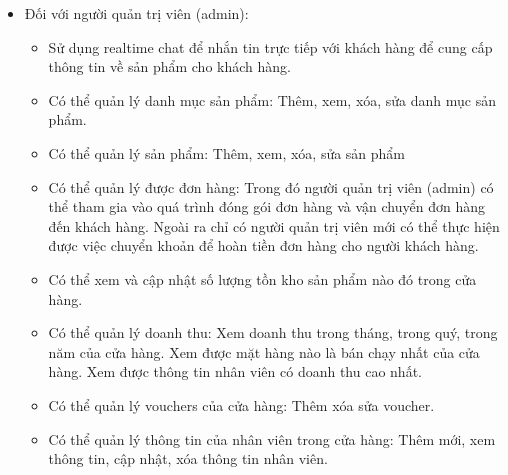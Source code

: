 \begin{itemize}
	\item Đối với người quản trị viên (admin):
	      \begin{itemize}
		      \item  Sử dụng realtime chat để nhắn tin trực tiếp với khách hàng để cung cấp thông tin về sản phẩm cho khách hàng.
		      \item Có thể quản lý danh mục sản phẩm: Thêm, xem, xóa, sửa danh mục sản phẩm.
		      \item Có thể quản lý sản phẩm: Thêm, xem, xóa, sửa sản phẩm
		      \item Có thể quản lý được đơn hàng: Trong đó người quản trị viên (admin) có thể tham gia vào quá trình đóng gói đơn hàng và vận chuyển đơn hàng đến khách hàng. Ngoài ra chỉ có người quản trị viên mới có thể thực hiện được việc chuyển khoản để hoàn tiền đơn hàng cho người khách hàng.
		      \item Có thể xem và cập nhật số lượng tồn kho sản phẩm nào đó trong cửa hàng.
		      \item Có thể quản lý doanh thu: Xem doanh thu trong tháng, trong quý, trong năm của cửa hàng. Xem được mặt hàng nào là bán chạy nhất của cửa hàng. Xem được thông tin nhân viên có doanh thu cao nhất.
		      \item Có thể quản lý vouchers của cửa hàng: Thêm xóa sửa voucher.
		      \item Có thể quản lý thông tin của nhân viên trong cửa hàng: Thêm mới, xem thông tin, cập nhật, xóa thông tin nhân viên.
	      \end{itemize}


\end{itemize}
